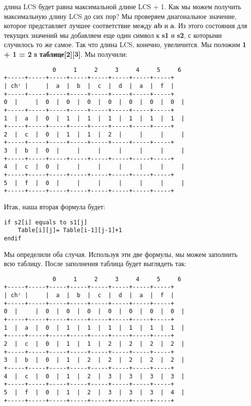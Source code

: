 длина LCS будет равна максимальной длине LCS + 1. Как мы можем получить
максимальную длину LCS до сих пор? Мы проверяем диагональное
значение, которое представляет лучшее соответствие между \textbf{ab} и \textbf{a}. Из этого
состояния для текущих значений мы добавляем еще один символ к \textbf{s1} и \textbf{s2}, с
которыми случилось то же самое. Так что длина LCS, конечно, увеличится.
Мы положим \textbf{1 + 1 = 2} в \textbf{таблице[2][3]}. Мы получили:
\vspace{\baselineskip}
\begin{tcolorbox}
\begin{verbatim}
              0     1     2     3     4     5     6
+-----+-----+-----+-----+-----+-----+-----+-----+
| chʳ |     |  a  |  b  |  c  |  d  |  a  |  f  |
+-----+-----+-----+-----+-----+-----+-----+-----+
0  |     |  0  |  0  |  0  |  0  |  0  |  0  |  0  |
+-----+-----+-----+-----+-----+-----+-----+-----+
1  |  a  |  0  |  1  |  1  |  1  |  1  |  1  |  1  |
+-----+-----+-----+-----+-----+-----+-----+-----+
2  |  c  |  0  |  1  |  1  |  2  |     |     |     |
+-----+-----+-----+-----+-----+-----+-----+-----+
3  |  b  |  0  |     |     |     |     |     |     |
+-----+-----+-----+-----+-----+-----+-----+-----+
4  |  c  |  0  |     |     |     |     |     |     |
+-----+-----+-----+-----+-----+-----+-----+-----+
5  |  f  |  0  |     |     |     |     |     |     |
+-----+-----+-----+-----+-----+-----+-----+-----+
\end{verbatim}
\end{tcolorbox}
\vspace{\baselineskip}
Итак, наша вторая формула будет:
\begin{tcolorbox}
\begin{verbatim}     
if s2[i] equals to s1[j]
    Table[i][j]= Table[i-1][j-1]+1
endif
\end{verbatim}
\end{tcolorbox}
\vspace{\baselineskip}
Мы определили оба случая. Используя эти две формулы, мы можем
заполнить всю таблицу. После заполнения таблица будет выглядеть так:
\vspace{\baselineskip}
\begin{tcolorbox}
\begin{verbatim}
              0     1     2     3     4     5     6
+-----+-----+-----+-----+-----+-----+-----+-----+
| chʳ |     |  a  |  b  |  c  |  d  |  a  |  f  |
+-----+-----+-----+-----+-----+-----+-----+-----+
0  |     |  0  |  0  |  0  |  0  |  0  |  0  |  0  |
+-----+-----+-----+-----+-----+-----+-----+-----+
1  |  a  |  0  |  1  |  1  |  1  |  1  |  1  |  1  |
+-----+-----+-----+-----+-----+-----+-----+-----+
2  |  c  |  0  |  1  |  1  |  2  |  2  |  2  |  2  |
+-----+-----+-----+-----+-----+-----+-----+-----+
3  |  b  |  0  |  1  |  2  |  2  |  2  |  2  |  2  |
+-----+-----+-----+-----+-----+-----+-----+-----+
4  |  c  |  0  |  1  |  2  |  3  |  3  |  3  |  3  |
+-----+-----+-----+-----+-----+-----+-----+-----+
5  |  f  |  0  |  1  |  2  |  3  |  3  |  3  |  4  |
+-----+-----+-----+-----+-----+-----+-----+-----+
\end{verbatim}
\end{tcolorbox}

